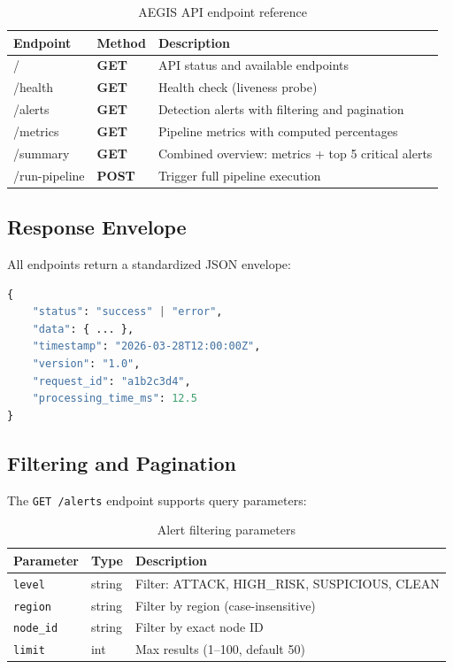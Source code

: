 \documentclass[12pt,a4paper]{article}
\begin{document}
\begin{table}[H]
\centering
\begin{tabularx}{\linewidth}{>{\ttfamily}l >{\bfseries}l X}
\toprule
Endpoint & Method & Description \\
\midrule
/ & GET & API status and available endpoints \\
/health & GET & Health check (liveness probe) \\
/alerts & GET & Detection alerts with filtering and pagination \\
/metrics & GET & Pipeline metrics with computed percentages \\
/summary & GET & Combined overview: metrics + top 5 critical alerts \\
/run-pipeline & POST & Trigger full pipeline execution \\
\bottomrule
\end{tabularx}
\caption{AEGIS API endpoint reference}
\end{table}

\subsection{Response Envelope}

All endpoints return a standardized JSON envelope:

\begin{lstlisting}[language=Python, caption={Standard API response format}]
{
    "status": "success" | "error",
    "data": { ... },
    "timestamp": "2026-03-28T12:00:00Z",
    "version": "1.0",
    "request_id": "a1b2c3d4",
    "processing_time_ms": 12.5
}
\end{lstlisting}

\subsection{Filtering and Pagination}

The \texttt{GET /alerts} endpoint supports query parameters:

\begin{table}[H]
\centering
\begin{tabularx}{\linewidth}{l l X}
\toprule
\textbf{Parameter} & \textbf{Type} & \textbf{Description} \\
\midrule
\texttt{level} & string & Filter: ATTACK, HIGH\_RISK, SUSPICIOUS, CLEAN \\
\texttt{region} & string & Filter by region (case-insensitive) \\
\texttt{node\_id} & string & Filter by exact node ID \\
\texttt{limit} & int & Max results (1--100, default 50) \\
\bottomrule
\end{tabularx}
\caption{Alert filtering parameters}
\end{table}
\end{document}
